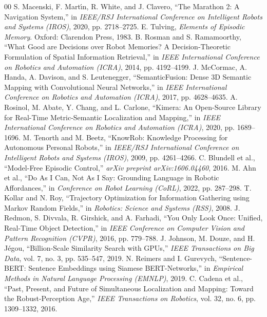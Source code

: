 \documentclass[conference]{IEEEtran}
\begin{document}
\begin{thebibliography}{00}
 S. Macenski, F. Mart{\'\i}n, R. White, and J. Clavero, ``The Marathon 2: A Navigation System,'' in \textit{IEEE/RSJ International Conference on Intelligent Robots and Systems (IROS)}, 2020, pp. 2718--2725.
 E. Tulving, \textit{Elements of Episodic Memory}. Oxford: Clarendon Press, 1983.
 B. Rosman and S. Ramamoorthy, ``What Good are Decisions over Robot Memories? A Decision-Theoretic Formulation of Spatial Information Retrieval,'' in \textit{IEEE International Conference on Robotics and Automation (ICRA)}, 2014, pp. 4192--4199.
 J. McCormac, A. Handa, A. Davison, and S. Leutenegger, ``SemanticFusion: Dense 3D Semantic Mapping with Convolutional Neural Networks,'' in \textit{IEEE International Conference on Robotics and Automation (ICRA)}, 2017, pp. 4628--4635.
 A. Rosinol, M. Abate, Y. Chang, and L. Carlone, ``Kimera: An Open-Source Library for Real-Time Metric-Semantic Localization and Mapping,'' in \textit{IEEE International Conference on Robotics and Automation (ICRA)}, 2020, pp. 1689--1696.
 M. Tenorth and M. Beetz, ``KnowRob: Knowledge Processing for Autonomous Personal Robots,'' in \textit{IEEE/RSJ International Conference on Intelligent Robots and Systems (IROS)}, 2009, pp. 4261--4266.
 C. Blundell et al., ``Model-Free Episodic Control,'' \textit{arXiv preprint arXiv:1606.04460}, 2016.
 M. Ahn et al., ``Do As I Can, Not As I Say: Grounding Language in Robotic Affordances,'' in \textit{Conference on Robot Learning (CoRL)}, 2022, pp. 287--298.
 T. Kollar and N. Roy, ``Trajectory Optimization for Information Gathering using Markov Random Fields,'' in \textit{Robotics: Science and Systems (RSS)}, 2008.
 J. Redmon, S. Divvala, R. Girshick, and A. Farhadi, ``You Only Look Once: Unified, Real-Time Object Detection,'' in \textit{IEEE Conference on Computer Vision and Pattern Recognition (CVPR)}, 2016, pp. 779--788.
 J. Johnson, M. Douze, and H. J{\'e}gou, ``Billion-Scale Similarity Search with GPUs,'' \textit{IEEE Transactions on Big Data}, vol. 7, no. 3, pp. 535--547, 2019.
 N. Reimers and I. Gurevych, ``Sentence-BERT: Sentence Embeddings using Siamese BERT-Networks,'' in \textit{Empirical Methods in Natural Language Processing (EMNLP)}, 2019.
 C. Cadena et al., ``Past, Present, and Future of Simultaneous Localization and Mapping: Toward the Robust-Perception Age,'' \textit{IEEE Transactions on Robotics}, vol. 32, no. 6, pp. 1309--1332, 2016.

\end{thebibliography}
\end{document}
